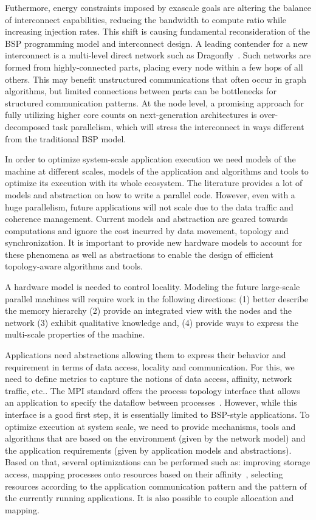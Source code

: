 Futhermore, energy constraints imposed by exascale goals are altering
the balance of interconnect capabilities, reducing the bandwidth to
compute ratio while increasing injection rates.  This shift is causing
fundamental reconsideration of the BSP programming model and
interconnect design.  A leading contender for a new interconnect is a
multi-level direct network such as
Dragonfly~\cite{4556717,ibm-percs-network}.  Such networks are formed
from highly-connected parts, placing every node within a few hops of all
others.  This may benefit unstructured communications that often occur
in graph
algorithms, but limited connections between parts can be bottlenecks for
structured communication patterns.  At the node level, a promising approach for fully utilizing
higher core counts on next-generation architectures is over-decomposed
task parallelism, which will stress the interconnect in ways different
from the traditional BSP model.


In order to optimize system-scale application execution we need models
of the machine at different scales, models of the application and algorithms
and tools to optimize its execution with its whole ecosystem. 
The literature provides a lot of models and abstraction on how to write a
parallel code. However, even with a huge parallelism, future applications will
not scale due to the data traffic and coherence management. Current models and
abstraction are geared towards computations and ignore the cost incurred by data
movement, topology and synchronization.  It is important to provide new hardware
models to account for these phenomena as well as abstractions to enable the
design of efficient topology-aware algorithms and tools. 

A hardware model is needed to control locality.  Modeling the future large-scale
parallel machines will require work in the following directions: (1) better
describe the memory hierarchy (2) provide an integrated view with the nodes and
the network (3) exhibit qualitative knowledge and, (4) provide ways to express
the multi-scale properties of the machine.

Applications need abstractions allowing them to express their behavior
and requirement in terms of data access, locality and communication.
For this, we need to define metrics to capture the notions of data
access, affinity, network traffic, etc.. The MPI standard offers the
process topology interface that allows an application to specify the
dataflow between processes~\cite{hoefler-mpi-2.2-scal-topo}. However,
while this interface is a good first step, it is essentially limited to
BSP-style applications.
%
To optimize execution at system scale, we need to provide mechanisms,
tools and algorithms that are based on the environment (given by the
network model) and the application requirements (given by application
models and abstractions). Based on that, several optimizations can be
performed such as: improving storage access, mapping processes onto
resources based on their
affinity~\cite{hjm14,DBLP:conf/ics/HoeflerS11,Navauxandal2009},
selecting resources according to the application communication pattern
and the pattern of the currently running applications. It is also
possible to couple allocation and mapping.


